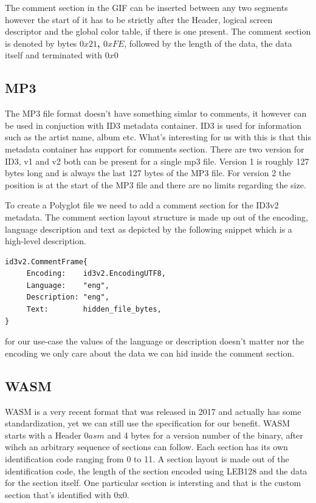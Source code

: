 The comment section in the GIF can be inserted between any two segments however the start of it has to be strictly after the Header, logical screen descriptor and the global color table,
if there is one present. The comment section is denoted by bytes \textbf{$0x21$, $0xFE$}, followed by the length of the data, the data itself and terminated with \textbf{$0x0$}

\subsection{MP3}

The MP3 file format doesn't have something simlar to comments, it however can be used in conjuction with ID3 metadata container. ID3 is used for information
such as the artist name, album etc. What's interesting for us with this is that this metadata container has support for comments section. There are two version
for ID3, v1 and v2 both can be present for a single mp3 file. Version 1 is roughly 127 bytes long and is always the last 127 bytes of the MP3 file. For version 2
the position is at the start of the MP3 file and there are no limits regarding the size\cite{mp3}.

To create a Polyglot file we need to add a comment section for the ID3v2 metadata. The comment section layout structure is made up out of the encoding, language
description and text as depicted by the following snippet which is a high-level description.

\begin{verbatim}
id3v2.CommentFrame{
     Encoding:    id3v2.EncodingUTF8,
     Language:    "eng",
     Description: "eng",
     Text:        hidden_file_bytes,
}
\end{verbatim}

for our use-case the values of the language or description doesn't matter nor the encoding we only care about the data we can hid inside the comment section.

\subsection{WASM}

WASM is a very recent format that was released in 2017 and actually has some standardization, yet we can still use the specification for our benefit.
WASM starts with a Header $0asm$ and 4 bytes for a version number of the binary, after wihch an arbitrary sequence of sections can follow. Each section has its
own identification code ranging from 0 to 11. A section layout is made out of the identification code, the length of the section encoded using LEB128 and
the data for the section itself. One particular section is intersting and that is the custom section that's identified with 0x0\cite{wasm}.

